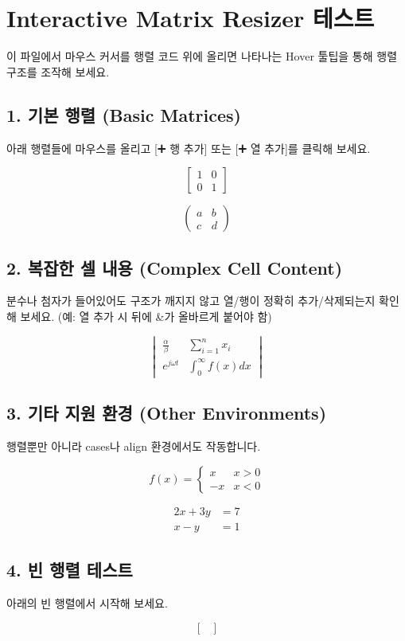 \documentclass{article}
\begin{document}
\section{Interactive Matrix Resizer 테스트}

이 파일에서 마우스 커서를 행렬 코드 위에 올리면 나타나는 Hover 툴팁을 통해 행렬 구조를 조작해 보세요.

\subsection{1. 기본 행렬 (Basic Matrices)}
아래 행렬들에 마우스를 올리고 [➕ 행 추가] 또는 [➕ 열 추가]를 클릭해 보세요.

\[
\begin{bmatrix}
    1 & 0 \\
    0 & 1
\end{bmatrix}
\]

\[
\begin{pmatrix}
    a & b \\
    c & d
\end{pmatrix}
\]

\subsection{2. 복잡한 셀 내용 (Complex Cell Content)}
분수나 첨자가 들어있어도 구조가 깨지지 않고 열/행이 정확히 추가/삭제되는지 확인해 보세요.
(예: 열 추가 시  뒤에 &가 올바르게 붙어야 함)

\[
\begin{vmatrix}
    \frac{\alpha}{\beta} & \sum_{i=1}^n x_i \\
    e^{j\omega t} & \int_0^\infty f(x)dx
\end{vmatrix}
\]

\subsection{3. 기타 지원 환경 (Other Environments)}
행렬뿐만 아니라 cases나 align 환경에서도 작동합니다.

\[
f(x) = \begin{cases}
    x & x > 0 \\
    -x & x < 0
\end{cases}
\]

\begin{align}
    2x + 3y &= 7 \\
    x - y &= 1
\end{align}

\subsection{4. 빈 행렬 테스트}
아래의 빈 행렬에서 시작해 보세요.

\[
\begin{bmatrix}
\end{bmatrix}
\]
\end{document}
